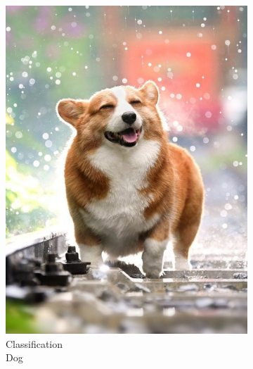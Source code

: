 	\begin{figure}
		\centering
		\begin{subfigure}{0.24\linewidth}
			\captionsetup{justification=centering}
			\centering
			\includegraphics[width=\linewidth]{img/compressed-dog.png}
			\caption{Classification \\ Dog}
		\end{subfigure}
		\begin{subfigure}{0.24\linewidth}
			\captionsetup{justification=centering}
			\centering

\end{subfigure}
\end{figure}
